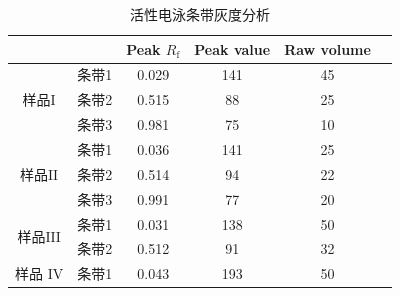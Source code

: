 
\begin{table}[]
\centering
\caption{活性电泳条带灰度分析}
\label{481}
\begin{tabular}{@{}cccccl@{}}
\toprule
                     &                      & Peak $R_\text{f}$              & Peak value           & Raw volume           &  \\ \midrule
\multirow{3}{*}{样品$\mathrm{I}$} & 条带1                  & 0.029                & 141                  & 45                   &  \\
                     & 条带2                  & 0.515                & 88                   & 25                   &  \\
                     & 条带3                  & 0.981                & 75                   & 10                   &  \\  \midrule
\multirow{3}{*}{样品$\mathrm{II}$} & 条带1                  & 0.036                & 141                  & 25                   &  \\
                     & 条带2                  & 0.514                & 94                   & 22                   &  \\
                     & 条带3                  & 0.991                & 77                   & 20                   &  \\  \midrule
\multirow{2}{*}{样品$\mathrm{III}$} & 条带1                  & 0.031                & 138                  & 50                   &  \\
                     & 条带2                  & 0.512                & 91                   & 32                   &  \\  \midrule
样品 $\mathrm{IV}$                 & 条带1                  & 0.043                & 193                  & 50                   &  \\
 \bottomrule
\end{tabular}
\end{table}

